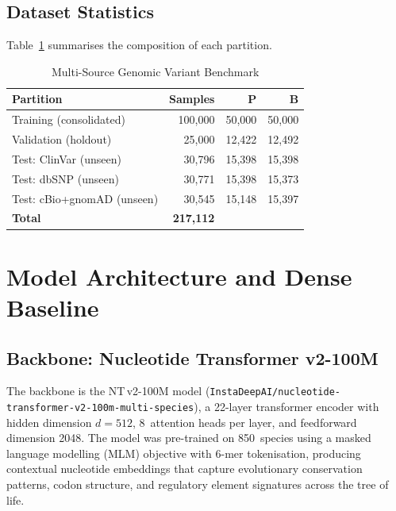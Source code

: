 \documentclass[journal]{IEEEtran}
\newcommand{\ntv}{NT\,v2-100M}
\begin{document}
\subsection{Dataset Statistics}

Table~\ref{tab:dataset} summarises the composition of each
partition.

\begin{table}[!t]
\centering
\caption{Multi-Source Genomic Variant Benchmark}
\label{tab:dataset}
\renewcommand{\arraystretch}{1.3}
\begin{tabular}{@{}lrrr@{}}
\toprule
\textbf{Partition} & \textbf{Samples} & \textbf{P} & \textbf{B} \\
\midrule
Training (consolidated)    & 100,000 & 50,000 & 50,000 \\
Validation (holdout)       &  25,000 & 12,422 & 12,492 \\
\midrule
Test: ClinVar (unseen)     &  30,796 & 15,398 & 15,398 \\
Test: dbSNP (unseen)       &  30,771 & 15,398 & 15,373 \\
Test: cBio+gnomAD (unseen) &  30,545 & 15,148 & 15,397 \\
\midrule
\textbf{Total}             & \textbf{217,112} & & \\
\bottomrule
\end{tabular}
\end{table}

\section{Model Architecture and Dense Baseline}
\label{sec:architecture}

\subsection{Backbone: Nucleotide Transformer v2-100M}

The backbone is the \ntv{} model
(\texttt{InstaDeepAI/nucleotide-transformer-v2-100m-multi-species}),
a 22-layer transformer encoder with hidden dimension $d = 512$,
8~attention heads per layer, and feedforward dimension 2048.
The model was pre-trained on 850~species using a masked language
modelling (MLM) objective with 6-mer tokenisation, producing
contextual nucleotide embeddings that capture evolutionary
conservation patterns, codon structure, and regulatory element
signatures across the tree of life.
\end{document}
